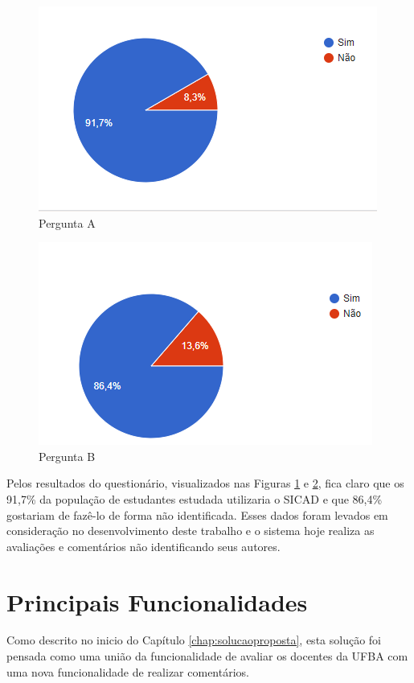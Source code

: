\documentclass[12pt, a4paper]{report}
\begin{document}
\begin{figure}
\centering
\includegraphics[scale=0.8]{pergunta_a.png}
\caption{Pergunta A}
\label{fig:pergunta_a}
\end{figure}

\begin{figure}
\centering
\includegraphics[scale=0.8]{pergunta_b}
\caption{Pergunta B}
\label{fig:pergunta_b}
\end{figure}

Pelos resultados do questionário, visualizados nas Figuras \ref{fig:pergunta_a} e \ref{fig:pergunta_b}, fica claro que os 91,7\% da população de estudantes estudada utilizaria o SICAD e que 86,4\% gostariam de fazê-lo de forma não identificada. Esses dados foram levados em consideração no desenvolvimento deste trabalho e o sistema hoje realiza as avaliações e comentários não identificando seus autores.


\section{ Principais Funcionalidades}
\label{sec:principaisfuncionalidades}

Como descrito no inicio do Capítulo \ref{chap:solucaoproposta}, esta solução foi pensada como uma união da funcionalidade de avaliar os docentes da UFBA com uma nova funcionalidade de realizar comentários.
\end{document}
